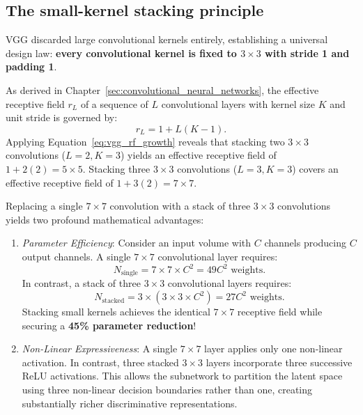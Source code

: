 \subsection{The small-kernel stacking principle}
\label{sec:vgg_stacking_principle}

VGG discarded large convolutional kernels entirely, establishing a universal design law: \textbf{every convolutional kernel is fixed to $3 \times 3$ with stride 1 and padding 1}.

As derived in Chapter~\ref{sec:convolutional_neural_networks}, the effective receptive field $r_L$ of a sequence of $L$ convolutional layers with kernel size $K$ and unit stride is governed by:
\begin{equation}
r_L = 1 + L(K - 1).
\label{eq:vgg_rf_growth}
\end{equation}
Applying Equation~\eqref{eq:vgg_rf_growth} reveals that stacking two $3 \times 3$ convolutions ($L=2, K=3$) yields an effective receptive field of $1 + 2(2) = 5 \times 5$. Stacking three $3 \times 3$ convolutions ($L=3, K=3$) covers an effective receptive field of $1 + 3(2) = 7 \times 7$.

Replacing a single $7 \times 7$ convolution with a stack of three $3 \times 3$ convolutions yields two profound mathematical advantages:
\begin{enumerate}[leftmargin=*]
  \item \textit{Parameter Efficiency}: Consider an input volume with $C$ channels producing $C$ output channels. A single $7 \times 7$ convolutional layer requires:
    \begin{equation}
    N_{\text{single}} = 7 \times 7 \times C^2 = 49 C^2 \text{ weights}.
    \end{equation}
    In contrast, a stack of three $3 \times 3$ convolutional layers requires:
    \begin{equation}
    N_{\text{stacked}} = 3 \times (3 \times 3 \times C^2) = 27 C^2 \text{ weights}.
    \end{equation}
    Stacking small kernels achieves the identical $7 \times 7$ receptive field while securing a \textbf{45\% parameter reduction}!
  \item \textit{Non-Linear Expressiveness}: A single $7 \times 7$ layer applies only one non-linear activation. In contrast, three stacked $3 \times 3$ layers incorporate three successive ReLU activations. This allows the subnetwork to partition the latent space using three non-linear decision boundaries rather than one, creating substantially richer discriminative representations.
\end{enumerate}

